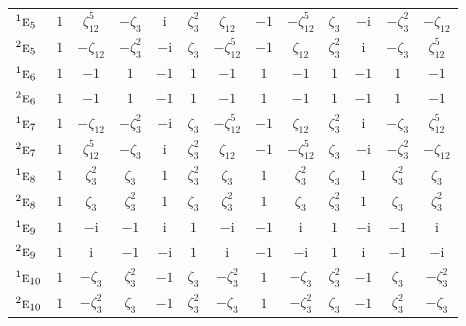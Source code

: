 \documentclass[10pt,a4paper]{article}
\numberwithin{equation}{section}
\newcommand{\irr}[1]{\text{\normalfont\scshape #1}}
\newcommand{\conjpair}[1]{{}^{#1}}
\newcommand{\iunit}{\mathrm{i}}
\newcommand{\rootunity}[1]{\zeta_{#1}}
\begin{document}
{\begin{longtable}{@{}lcccccccccccc@{}}
$\conjpair{1}\irr{e}_{5}$ & $1$ & $\rootunity{12}^{5}$ & $-\rootunity{3}$ & $\iunit{}$ & $\rootunity{3}^{2}$ & $\rootunity{12}$ & $-1$ & $-\rootunity{12}^{5}$ & $\rootunity{3}$ & $-\iunit{}$ & $-\rootunity{3}^{2}$ & $-\rootunity{12}$\\
$\conjpair{2}\irr{e}_{5}$ & $1$ & $-\rootunity{12}$ & $-\rootunity{3}^{2}$ & $-\iunit{}$ & $\rootunity{3}$ & $-\rootunity{12}^{5}$ & $-1$ & $\rootunity{12}$ & $\rootunity{3}^{2}$ & $\iunit{}$ & $-\rootunity{3}$ & $\rootunity{12}^{5}$\\
$\conjpair{1}\irr{e}_{6}$ & $1$ & $-1$ & $1$ & $-1$ & $1$ & $-1$ & $1$ & $-1$ & $1$ & $-1$ & $1$ & $-1$\\
$\conjpair{2}\irr{e}_{6}$ & $1$ & $-1$ & $1$ & $-1$ & $1$ & $-1$ & $1$ & $-1$ & $1$ & $-1$ & $1$ & $-1$\\
$\conjpair{1}\irr{e}_{7}$ & $1$ & $-\rootunity{12}$ & $-\rootunity{3}^{2}$ & $-\iunit{}$ & $\rootunity{3}$ & $-\rootunity{12}^{5}$ & $-1$ & $\rootunity{12}$ & $\rootunity{3}^{2}$ & $\iunit{}$ & $-\rootunity{3}$ & $\rootunity{12}^{5}$\\
$\conjpair{2}\irr{e}_{7}$ & $1$ & $\rootunity{12}^{5}$ & $-\rootunity{3}$ & $\iunit{}$ & $\rootunity{3}^{2}$ & $\rootunity{12}$ & $-1$ & $-\rootunity{12}^{5}$ & $\rootunity{3}$ & $-\iunit{}$ & $-\rootunity{3}^{2}$ & $-\rootunity{12}$\\
$\conjpair{1}\irr{e}_{8}$ & $1$ & $\rootunity{3}^{2}$ & $\rootunity{3}$ & $1$ & $\rootunity{3}^{2}$ & $\rootunity{3}$ & $1$ & $\rootunity{3}^{2}$ & $\rootunity{3}$ & $1$ & $\rootunity{3}^{2}$ & $\rootunity{3}$\\
$\conjpair{2}\irr{e}_{8}$ & $1$ & $\rootunity{3}$ & $\rootunity{3}^{2}$ & $1$ & $\rootunity{3}$ & $\rootunity{3}^{2}$ & $1$ & $\rootunity{3}$ & $\rootunity{3}^{2}$ & $1$ & $\rootunity{3}$ & $\rootunity{3}^{2}$\\
$\conjpair{1}\irr{e}_{9}$ & $1$ & $-\iunit{}$ & $-1$ & $\iunit{}$ & $1$ & $-\iunit{}$ & $-1$ & $\iunit{}$ & $1$ & $-\iunit{}$ & $-1$ & $\iunit{}$\\
$\conjpair{2}\irr{e}_{9}$ & $1$ & $\iunit{}$ & $-1$ & $-\iunit{}$ & $1$ & $\iunit{}$ & $-1$ & $-\iunit{}$ & $1$ & $\iunit{}$ & $-1$ & $-\iunit{}$\\
$\conjpair{1}\irr{e}_{10}$ & $1$ & $-\rootunity{3}$ & $\rootunity{3}^{2}$ & $-1$ & $\rootunity{3}$ & $-\rootunity{3}^{2}$ & $1$ & $-\rootunity{3}$ & $\rootunity{3}^{2}$ & $-1$ & $\rootunity{3}$ & $-\rootunity{3}^{2}$\\
$\conjpair{2}\irr{e}_{10}$ & $1$ & $-\rootunity{3}^{2}$ & $\rootunity{3}$ & $-1$ & $\rootunity{3}^{2}$ & $-\rootunity{3}$ & $1$ & $-\rootunity{3}^{2}$ & $\rootunity{3}$ & $-1$ & $\rootunity{3}^{2}$ & $-\rootunity{3}$\\

\end{longtable}}
\end{document}
